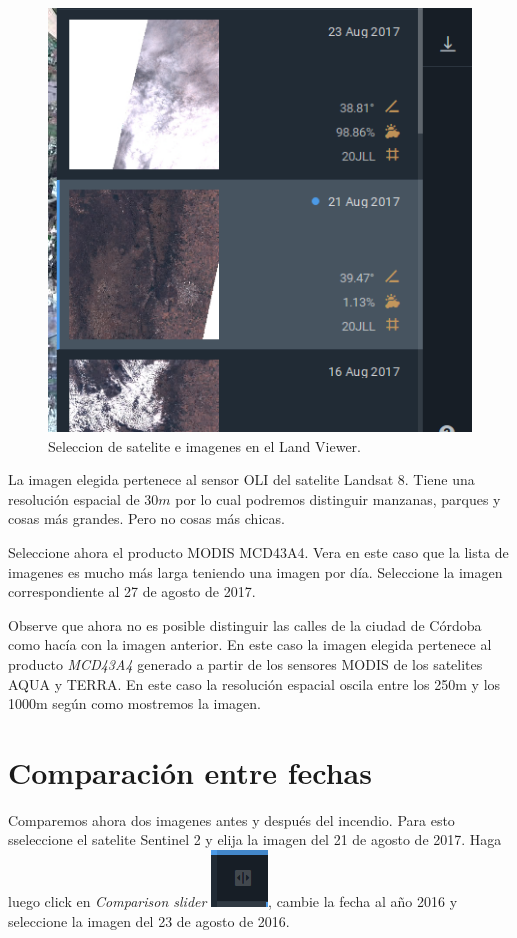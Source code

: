 \documentclass[a4paper,12pt]{book}
\begin{document}
\begin{figure}[h!]
\begin{minipage}{.425\linewidth}
  \includegraphics[width=\linewidth]{fig:imagen1.png}
\end{minipage}
\caption{Seleccion de satelite e imagenes en el Land Viewer.}
\label{fig:scene}
\end{figure}

La imagen elegida pertenece al sensor OLI del satelite Landsat 8. Tiene una resolución espacial de $30m$ por lo cual podremos distinguir manzanas, parques y cosas más grandes. Pero no cosas más chicas.

Seleccione ahora el producto MODIS MCD43A4. Vera en este caso que la lista de imagenes es mucho más larga teniendo una imagen por día. Seleccione la imagen correspondiente al 27 de agosto de 2017.

Observe que ahora no es posible distinguir las calles de la ciudad de Córdoba como hacía con la imagen anterior. En este caso la imagen elegida pertenece al producto \emph{MCD43A4} generado a partir de los sensores MODIS de los satelites AQUA y TERRA. En este caso la resolución espacial oscila entre los 250m y los 1000m según como mostremos la imagen.

\section{Comparación entre fechas}
Comparemos ahora dos imagenes antes y después del incendio. Para esto sseleccione el satelite Sentinel 2 y elija la imagen del 21 de agosto de 2017. Haga luego click en \emph{Comparison slider} \includegraphics[scale=0.2]{in:LR.png}, cambie la fecha al año 2016 y seleccione la imagen del 23 de agosto de 2016.
\end{document}
